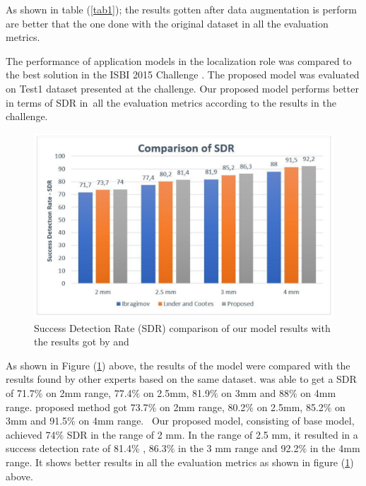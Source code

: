 \documentclass{elektr}
\begin{document}


\tab As shown in table (\ref{tab1}); the results gotten after data augmentation is perform are better that the one done with the original dataset in all the evaluation metrics.

\tab The performance of application models in the localization role was compared to the best solution in the ISBI 2015 Challenge \cite{ref7}. The proposed model was evaluated on Test1 dataset presented at the challenge. Our proposed model performs better in terms of SDR in\ all the evaluation metrics according to the results in the challenge.  




\begin{figure}[H]
	\begin{center}
		\includegraphics[width=5.76in]{./media/image4}
		\caption{Success Detection Rate (SDR) comparison of our model results with the results got by \cite{ref3} and \cite{ref8}}
		\label{fig4}
	\end{center}\vs{-4mm}
\end{figure}




\tab As shown in Figure (\ref{fig4}) above, the results of the model were compared with the results found by other experts based on the same dataset. \cite{ref4} was able to get a SDR of 71.7$\%$  on 2mm range, 77.4$\%$  on 2.5mm, 81.9$\%$  on 3mm and 88$\%$  on 4mm range. \cite{ref8} proposed method got 73.7$\%$  on 2mm range, 80.2$\%$  on 2.5mm, 85.2$\%$  on 3mm and 91.5$\%$  on 4mm range. \  Our proposed model, consisting of base model, achieved 74$\%$  SDR in the range of 2 mm. In the range of 2.5 mm, it resulted in a success detection rate of 81.4$\%$ , 86.3$\%$  in the 3 mm range and 92.2$\%$  in the 4mm range. It shows better results in all the evaluation metrics as shown in figure (\ref{fig4}) above. 
\end{document}
